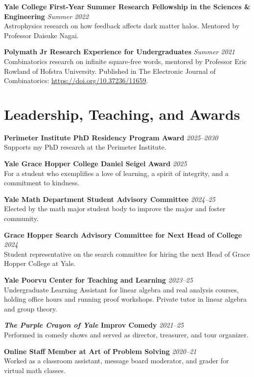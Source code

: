 \documentclass[11pt]{article}
\newcommand{\entry}[3]{
    \vspace{-.58em}
    \textbf{#1} \hfill \textit{#2} \\
    #3 \vspace{0.5em}}
\begin{document}
\entry{Yale College First-Year Summer Research Fellowship in the Sciences \& Engineering}{Summer 2022}{
Astrophysics research on how feedback affects dark matter halos. Mentored by Professor Daisuke Nagai.
}

\entry{Polymath Jr Research Experience for Undergraduates}{Summer 2021}{
Combinatorics research on infinite square-free words, mentored by Professor Eric Rowland of Hofstra University. Published in The Electronic Journal of Combinatorics: \href{https://doi.org/10.37236/11659}{https://doi.org/10.37236/11659}.
}


\section*{Leadership, Teaching, and Awards}
\vspace{0.58em}
\vspace{-0.1em}

\entry{Perimeter Institute PhD Residency Program Award}{2025--2030}{
Supports my PhD research at the Perimeter Institute.
}

\entry{Yale Grace Hopper College Daniel Seigel Award}{2025}{
For a student who exemplifies a love of learning, a spirit of integrity, and a commitment to kindness.
}

\entry{Yale Math Department Student Advisory Committee}{2024--25}{
Elected by the math major student body to improve the major and foster community.
}

\entry{Grace Hopper Search Advisory Committee for Next Head of College}{2024}{
Student representative on the search committee for hiring the next Head of Grace Hopper College at Yale.
}

\entry{Yale Poorvu Center for Teaching and Learning}{2023--25}{
Undergraduate Learning Assistant for linear algebra and real analysis courses, holding office hours and running proof workshops. Private tutor in linear algebra and group theory.
}

\entry{\textit{The Purple Crayon of Yale} Improv Comedy}{2021--25}{
Performed in comedy shows and served as director, treasurer, and tour organizer.
}

\entry{Online Staff Member at Art of Problem Solving}{2020--21}{
Worked as a classroom assistant, message board moderator, and grader for virtual math classes.
}
\end{document}
